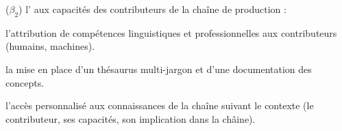 \begin{listeni}
	\item[($\beta_2$)] l' aux capacités des contributeurs de la chaîne de production : 
	\begin{liste}
		\item l'attribution de compétences linguistiques et professionnelles aux contributeurs (humains, machines).
		\item la mise en place d'un thésaurus multi-jargon et d'une documentation des concepts.
		\item l'accès personnalisé aux connaissances de la chaîne suivant le contexte (le contributeur, ses capacités, son implication dans la châine).
	\end{liste}

\end{listeni}




